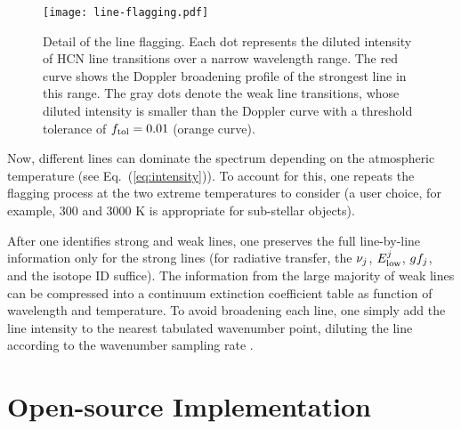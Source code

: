 \documentclass[tighten, times, twocolumn, trackchanges]{aastex61}
\let\oldmsp=\sp
\let\oldmsb=\sb
\def\sp#1{\ifmmode
           \oldmsp{#1}%
         \else\strut\raise.85ex\hbox{\scriptsize #1}\fi}
\def\sb#1{\ifmmode
           \oldmsb{#1}%
         \else\strut\raise-.54ex\hbox{\scriptsize #1}\fi}
\begin{document}
\begin{figure}[t]
\centering
\texttt{[image: line-flagging.pdf]}
\caption{
Detail of the line flagging.  Each dot represents the diluted
intensity of HCN line transitions over a narrow wavelength range.  The
red curve shows the Doppler broadening profile of the strongest line
in this range.  The gray dots denote the weak line transitions, whose
diluted intensity is smaller than the Doppler curve with a 
threshold tolerance of $f\sb{\rm tol}=0.01$ (orange curve).}
\label{fig:flagging}
\end{figure}

Now, different lines can dominate the spectrum depending on the
atmospheric temperature (see Eq.\ (\ref{eq:intensity})).  To account
for this, one repeats the flagging process at the two extreme
temperatures to consider (a user choice, for example, 300 and 3000 K
is appropriate for sub-stellar objects).

After one identifies strong and weak lines, one preserves the full
line-by-line information only for the strong lines (for radiative
transfer, the $\nu\sb{j}$, $E\sb{\rm low}\sp{j}$, $gf\sb{j}$, and the
isotope ID suffice).  The information from the large majority of weak
lines can be compressed into a continuum extinction coefficient table
as function of wavelength and temperature. To avoid broadening each
line, one simply add the line intensity to the nearest tabulated
wavenumber point, diluting the line according to the wavenumber
sampling rate \citep[following][]{SharpBurrows2007apjOpacities}.


\section{Open-source Implementation}
\end{document}
